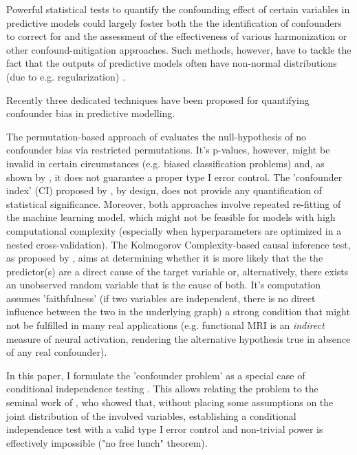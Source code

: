 \documentclass{article}
\begin{document}
Powerful statistical tests to quantify the confounding effect of certain variables in predictive models could largely foster both the the identification of confounders to correct for and the assessment of the effectiveness of various harmonization or other confound-mitigation approaches. Such methods, however, have to tackle the fact that the outputs of predictive models often have non-normal distributions (due to e.g. regularization) \citep{garcia2009study, kristensen2017whole}.

Recently three dedicated techniques \citep{chaibub2019permutation, ferrari2020measuring, wachinger2021detect} have been proposed for quantifying confounder bias in predictive modelling.

The permutation-based approach of \cite{chaibub2019permutation} evaluates the null-hypothesis of no confounder bias via restricted permutations. It's p-values, however, might be invalid in certain circumstances (e.g. biased classification problems) and, as shown by \cite{ferrari2020measuring}, it does not guarantee a proper type I error control.
The 'confounder index' (CI) proposed by \cite{ferrari2020measuring}, by design, does not provide any quantification of statistical significance.
Moreover, both approaches involve repeated re-fitting of the machine learning model, which might not be feasible for models with high computational complexity (especially when hyperparameters are optimized in a nested cross-validation).
The Kolmogorov Complexity-based causal inference test, as proposed by \cite{wachinger2021detect}, aims at determining whether it is more likely that the the predictor(s) are a direct cause of the target variable or, alternatively, there exists an unobserved random variable that is the cause of both. It's computation assumes 'faithfulness' (if two variables are independent, there is no direct influence between the two in the underlying graph) a strong condition that might not be fulfilled in many real applications (e.g. functional MRI is an \emph{indirect} measure of neural activation, rendering the alternative hypothesis true in absence of any real confounder).


In this paper, I formulate the 'confounder problem' as a special case of conditional independence testing \citep{dawid1979conditional}. This allows relating the problem to the seminal work of \cite{shah2020hardness}, who showed that, without placing some assumptions on the joint distribution of the involved variables, establishing a conditional independence test with a valid type I error control and non-trivial power is effectively impossible ("no free lunch" theorem).
\end{document}
